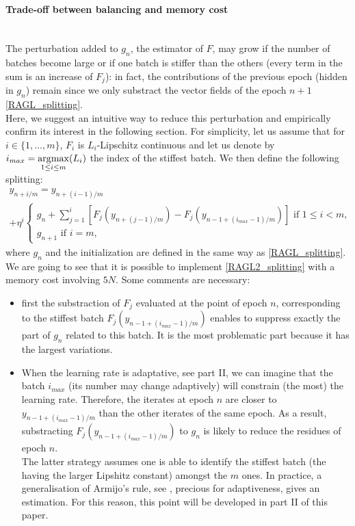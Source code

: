 \paragraph{Trade-off between balancing and memory cost}
~~\\
The perturbation added to $g_n$, the estimator of $F$, may grow if the number of batches become large or if one batch is stiffer than the others (every term in the sum is an increase of $F_j$): in fact, the contributions of the previous epoch (hidden in $g_n$) remain since we only substract the vector fields of the epoch $n+1$ \eqref{RAGL_splitting}. \\ 
Here, we suggest an intuitive way to reduce this perturbation and empirically confirm its interest in the following section. For simplicity, let us assume that for $i\in \{1,\dots,m\}$, $F_i$ is $L_i$-Lipschitz continuous and let us denote by $i_{max} = \displaystyle{\operatorname*{\arg\!\max}_{1 \leq i \leq m}} (L_i)$ the index of the stiffest batch. We then define the following splitting:
\begin{multline}
	y_{n+i/m} = y_{n+(i-1)/m} \\
	+\eta^i
	\left\{
	\begin{array}{ll}
		g_n+\displaystyle{\sum_{j=1}^i} \left[F_j\left(y_{n+(j-1)/m}\right)-F_j\left(y_{n-1+(i_{max}-1)/m}\right)\right] \text{ if } 1\leq i<m,\\
		g_{n+1} \text{ if } i=m,
	\end{array}
	\right.
	\label{RAGL2_splitting}
\end{multline}
where $g_n$ and the initialization are defined in the same way as \eqref{RAGL_splitting}. We are going to see that it is possible to implement \eqref{RAGL2_splitting} with a memory cost involving $5N$.
Some comments are necessary:
\begin{itemize}
	\item first the substraction of $F_j$ evaluated at the point of epoch $n$, corresponding to the stiffest batch $F_j\left(y_{n-1+(i_{max}-1)/m}\right)$ enables to suppress exactly the part of $g_n$ related to this batch. It is the most problematic part because it has the largest variations.
        \item When the learning rate is adaptative, see part II, we can imagine that the batch $i_{max}$ (its number may change adaptively) will constrain (the most) the learning rate. Therefore, the
          iterates at epoch $n$ are closer to $y_{n-1+(i_{max}-1)/m}$ than the other iterates of the same epoch. As a result, substracting $F_j\left(y_{n-1+(i_{max}-1)/m}\right)$ to $g_n$ is likely to reduce the residues of epoch $n$. \\
{The latter strategy assumes one is able to identify the stiffest batch (the having the larger Lipshitz constant) amongst the $m$ ones. 
In practice, a generalisation of Armijo's rule, see \cite{Bilel_thesis}, precious for adaptiveness, gives an estimation. For this reason, this point will be developed in part II of this paper. }
\end{itemize} 


